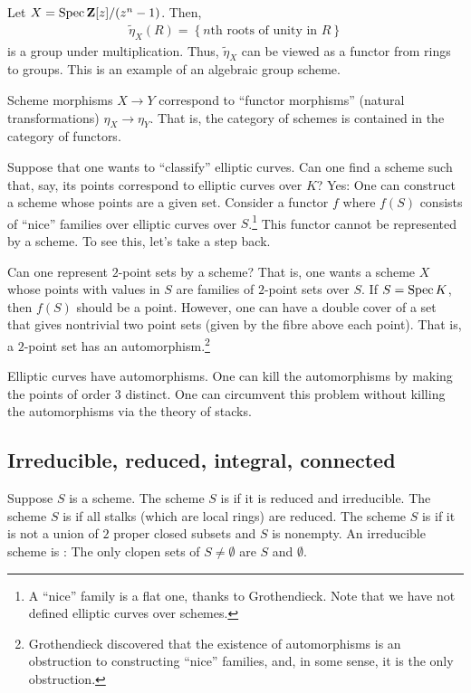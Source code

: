 \documentclass [11 pt, oneside] {article}
\begin{document}
\begin{example}[ ]\label{}\text{}
Let $X=\operatorname{Spec} \mathbf{Z}[z] / (z^n-1)$. Then, 
 \begin{align*}
	\tilde \eta_X(R) =  \left\{ \textrm{$n$th roots of unity in $R$}\right\} 
\end{align*}
is a group under multiplication. Thus, $\tilde\eta_X$ can be viewed as a functor from rings to groups. This is an example of an algebraic group scheme.
\end{example}

\begin{remark}
	Scheme morphisms $X\longrightarrow Y$ correspond to ``functor morphisms'' (natural transformations) $\eta_X\longrightarrow \eta_Y$. That is, the category of schemes is contained in the category of functors.
\end{remark}

Suppose that one wants to ``classify'' elliptic curves. Can one find a scheme such that, say, its points correspond to elliptic curves over $K$? Yes: One can construct a scheme whose points are a given set. Consider a functor $f$ where $f(S)$ consists of ``nice'' families over elliptic curves over $S$.\footnote{A ``nice'' family is a flat one, thanks to Grothendieck. Note that we have not defined elliptic curves over schemes.} This functor cannot be represented by a scheme. To see this, let's take a step back.

Can one represent $2$-point sets by a scheme? That is, one wants a scheme $X$ whose points with values in $S$ are families of $2$-point sets over $S$. If $S=\operatorname{Spec} K$, then $f(S)$ should be a point. However, one can have a double cover of a set that gives nontrivial two point sets (given by the fibre above each point). That is, a $2$-point set has an automorphism.\footnote{Grothendieck discovered that the existence of automorphisms is an obstruction to constructing ``nice'' families, and, in some sense, it is the only obstruction.} 

Elliptic curves have automorphisms. One can kill the automorphisms by making the points of order $3$ distinct. One can circumvent this problem without killing the automorphisms via the theory of stacks.

\subsection{Irreducible, reduced, integral, connected}
Suppose $S$ is a scheme. The scheme $S$ is  if it is reduced and irreducible. The scheme $S$ is  if all stalks (which are local rings) are reduced. The scheme $S$ is  if it is not a union of $2$ proper closed subsets and $S$ is nonempty. An irreducible scheme is : The only clopen sets of $S\ne \emptyset$ are $S$ and $\emptyset$.
\end{document}
